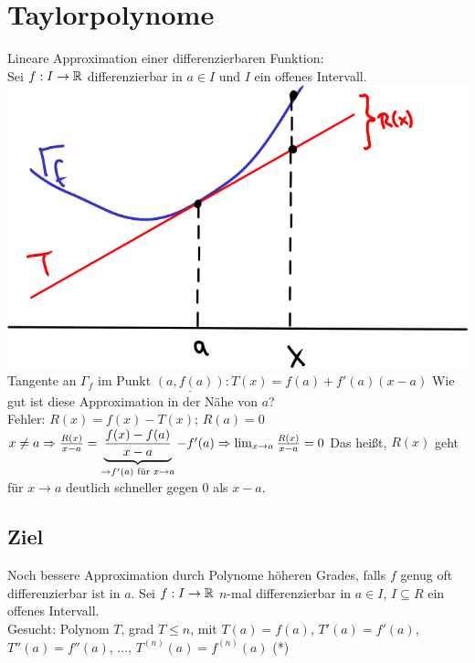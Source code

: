 \section*{Taylorpolynome}
Lineare Approximation einer differenzierbaren Funktion:\\
Sei $f: I \to \mathbb{R}$ differenzierbar in $a \in I$ und $I$ ein offenes Intervall.\nl
\includegraphics[scale=0.5]{img/2014-01-30/1}\nl %
Tangente an $\Gamma_f$ im Punkt $\underline{(a,f(a))}: T(x) = f(a)+f'(a)(x-a)$\nl
Wie gut ist diese Approximation in der Nähe von $a$?\\
Fehler: $R(x) = f(x)-T(x)$; $R(a) = 0$\\
$x \neq a \Rightarrow \frac{R(x)}{x-a} = \underbrace{\frac{f(x)-f(a)}{x-a}}_{\to f'(a) \text{ für } x \to a} - f'(a) \Rightarrow \lim_{x \to a} \frac{R(x)}{x-a} = 0$\nl
Das heißt, $R(x)$ geht für $x \to a$ deutlich schneller gegen $0$ als $x-a$.

\subsection*{Ziel}
Noch bessere Approximation durch Polynome höheren Grades, falls $f$ genug oft differenzierbar ist in $a$.\nl
Sei $f: I \to \mathbb{R}$ $n$-mal differenzierbar in $a \in I$, $I \subseteq R$ ein offenes Intervall.\\
Gesucht: Polynom $T$, grad $T \le n$, mit $T(a)=f(a)$, $T'(a)=f'(a)$, $T''(a)=f''(a)$, $\ldots$, $T^{(n)}(a) = f^{(n)}(a)$ (*)

